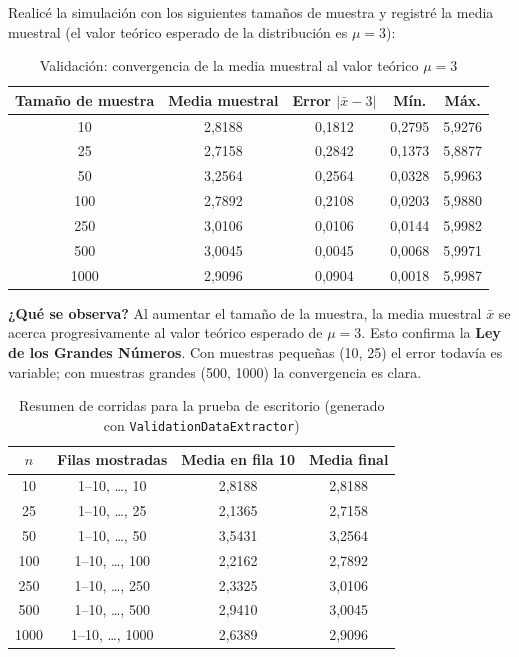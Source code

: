 \documentclass[12pt,a4paper]{article}
\begin{document}
Realicé la simulación con los siguientes tamaños de muestra y registré la media muestral (el valor teórico esperado de la distribución es $\mu = 3$):

\begin{table}[H]
\centering
\caption{Validación: convergencia de la media muestral al valor teórico $\mu = 3$}
\begin{tabular}{ccccc}
\toprule
\textbf{Tamaño de muestra} & \textbf{Media muestral} & \textbf{Error} $|\bar{x} - 3|$ & \textbf{Mín.} & \textbf{Máx.} \\
\midrule
10   & 2,8188 & 0,1812 & 0,2795 & 5,9276 \\
25   & 2,7158 & 0,2842 & 0,1373 & 5,8877 \\
50   & 3,2564 & 0,2564 & 0,0328 & 5,9963 \\
100  & 2,7892 & 0,2108 & 0,0203 & 5,9880 \\
250  & 3,0106 & 0,0106 & 0,0144 & 5,9982 \\
500  & 3,0045 & 0,0045 & 0,0068 & 5,9971 \\
1000 & 2,9096 & 0,0904 & 0,0018 & 5,9987 \\
\bottomrule
\end{tabular}
\end{table}

\begin{notabox}
\textbf{¿Qué se observa?} Al aumentar el tamaño de la muestra, la media muestral $\bar{x}$ se acerca progresivamente al valor teórico esperado de $\mu = 3$. Esto confirma la \textbf{Ley de los Grandes Números}. Con muestras pequeñas (10, 25) el error todavía es variable; con muestras grandes (500, 1000) la convergencia es clara.
\end{notabox}

\begin{table}[H]
\centering
\caption{Resumen de corridas para la prueba de escritorio (generado con \texttt{ValidationDataExtractor})}
\begin{tabular}{cccc}
\toprule
\textbf{$n$} & \textbf{Filas mostradas} & \textbf{Media en fila 10} & \textbf{Media final} \\
\midrule
10   & 1--10, \ldots, 10   & 2,8188 & 2,8188 \\
25   & 1--10, \ldots, 25   & 2,1365 & 2,7158 \\
50   & 1--10, \ldots, 50   & 3,5431 & 3,2564 \\
100  & 1--10, \ldots, 100  & 2,2162 & 2,7892 \\
250  & 1--10, \ldots, 250  & 2,3325 & 3,0106 \\
500  & 1--10, \ldots, 500  & 2,9410 & 3,0045 \\
1000 & 1--10, \ldots, 1000 & 2,6389 & 2,9096 \\
\bottomrule
\end{tabular}
\end{table}
\end{document}
